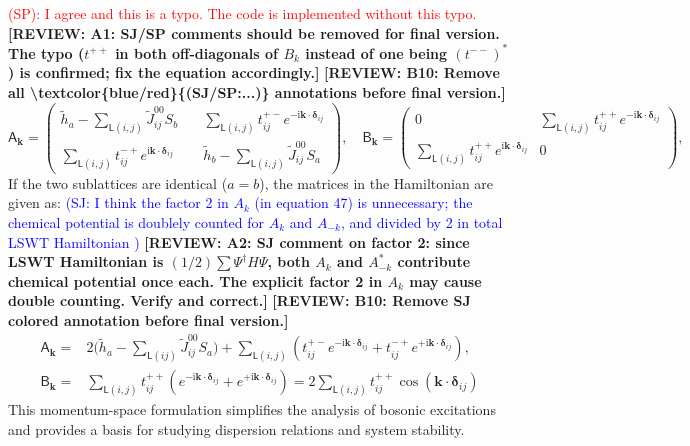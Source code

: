 \documentclass[aps, prx, nofootinbib, superscriptaddress]{revtex4-2}
\newcommand{\REVIEW}[1]{{\color{reviewcolor}\bfseries [REVIEW: #1]}}
\newcommand{\kvec}{\mathbf{k}}
\newcommand{\ri}{\mathrm{i}}
\begin{document}
\textcolor{red}{ (SP):
    I agree and this is a typo. The code is implemented without this typo.
}
\REVIEW{A1: SJ/SP comments should be removed for final version. The typo ($t^{++}$ in both off-diagonals of $B_k$ instead of one being $(t^{--})^*$) is confirmed; fix the equation accordingly.}
\REVIEW{B10: Remove all \textbackslash textcolor\{blue/red\}\{(SJ/SP:...)\} annotations before final version.}
\begin{equation}
    \mathsf{A}_{\kvec} = 
    \begin{pmatrix}
        \widetilde{h}_{a} - \sum_{\mathsf{L}(i,j)} \widetilde{J}_{ij}^{00} S_{b} \quad
        & \sum_{\mathsf{L}(i,j)}t^{+-}_{ij} e^{-\ri \kvec \cdot \bm{\delta}_{ij}} \\[0.5em]
        \sum_{\mathsf{L}(i,j)}t^{-+}_{ij} e^{\ri \kvec \cdot \bm{\delta}_{ij}} \quad &
        \widetilde{h}_{b} - \sum_{\mathsf{L}(i,j)} \widetilde{J}_{ij}^{00} S_{a}
    \end{pmatrix},
    \quad  \mathsf{B}_{\kvec} =
    \begin{pmatrix}
        0   & \sum_{\mathsf{L}(i,j)}t^{++}_{ij} e^{-\ri \kvec \cdot \bm{\delta}_{ij}} \\[0.5em]
        \sum_{\mathsf{L}(i,j)}t^{++}_{ij} e^{\ri \kvec \cdot \bm{\delta}_{ij}} &    0
    \end{pmatrix},
\end{equation}
If the two sublattices are identical ($a = b$), the matrices in the Hamiltonian are given as: \textcolor{blue}{(SJ: I think the factor 2 in $A_k$ (in equation 47) is unnecessary; the chemical potential is doublely counted for $A_k$ and $A_{-k}$, and divided by 2 in total LSWT Hamiltonian )}
\REVIEW{A2: SJ comment on factor 2: since LSWT Hamiltonian is $(1/2)\sum \Psi^\dagger H \Psi$, both $A_k$ and $A_{-k}^*$ contribute chemical potential once each. The explicit factor 2 in $A_k$ may cause double counting. Verify and correct.}
\REVIEW{B10: Remove SJ colored annotation before final version.}
\begin{equation}
    \begin{split}
        \mathsf{A}_{\kvec} 
        = & 2 \Big( \widetilde{h}_{a} - \sum_{\mathsf{L}(ij)} \widetilde{J}_{ij}^{00} S_{a} \Big)
        + \sum_{\mathsf{L}(i,j)}(t_{ij}^{+-} e^{-\ri \kvec \cdot \bm{\delta}_{ij}} + t^{-+}_{ij} e^{+\ri \kvec \cdot \bm{\delta}_{ij}}), \\
        \mathsf{B}_{\kvec}
        = & \sum_{\mathsf{L}(i,j)}t^{++}_{ij} (e^{-\ri \kvec \cdot \bm{\delta}_{ij}} + e^{+\ri \kvec \cdot \bm{\delta}_{ij}})
        = 2 \sum_{\mathsf{L}(i,j)}t^{++}_{ij} \cos ( \kvec \cdot \bm{\delta}_{ij}) 
    \end{split}
\end{equation}
This momentum-space formulation simplifies the analysis of bosonic excitations and provides a basis for studying dispersion relations and system stability.
\end{document}

